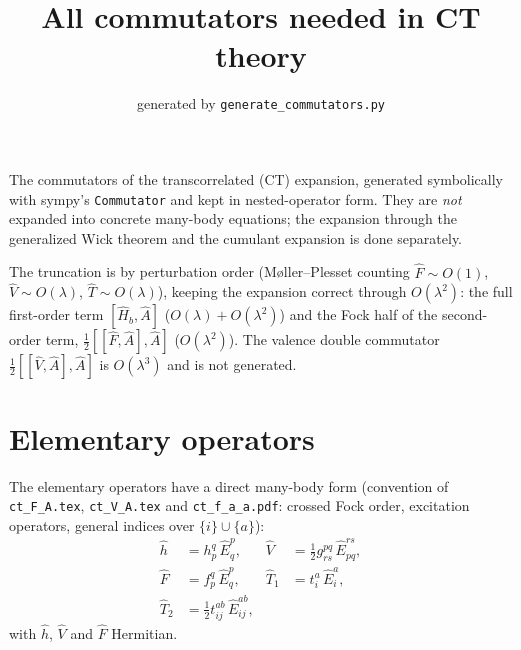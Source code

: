 \documentclass[11pt]{article}
\title{All commutators needed in CT theory}
\date{generated by \texttt{generate\_commutators.py}}
\begin{document}
\maketitle

The commutators of the transcorrelated (CT) expansion, generated symbolically with sympy's \texttt{Commutator} and kept in nested-operator form.  They are \emph{not} expanded into concrete many-body equations; the expansion through the generalized Wick theorem and the cumulant expansion is done separately.

The truncation is by perturbation order (M\o ller--Plesset counting $\hat{F} \sim O(1)$, $\hat{V} \sim O(\lambda)$, $\hat{T} \sim O(\lambda)$), keeping the expansion correct through $O(\lambda^2)$: the full first-order term $[\hat{H}_b, \hat{A}]$ ($O(\lambda) + O(\lambda^2)$) and the Fock half of the second-order term, $\tfrac{1}{2}[[\hat{F}, \hat{A}], \hat{A}]$ ($O(\lambda^2)$).  The valence double commutator $\tfrac{1}{2}[[\hat{V}, \hat{A}], \hat{A}]$ is $O(\lambda^3)$ and is not generated.

\section{Elementary operators}
The elementary operators have a direct many-body form (convention of \texttt{ct\_F\_A.tex}, \texttt{ct\_V\_A.tex} and \texttt{ct\_f\_a\_a.pdf}: crossed Fock order, excitation operators, general indices over $\{i\}\cup\{a\}$):
\begin{align}
\hat{h} &= h^q_p\, \hat{E}^p_q, & \hat{V} &= \tfrac{1}{2} g^{pq}_{rs}\, \hat{E}^{rs}_{pq}, \\
\hat{F} &= f^q_p\, \hat{E}^p_q, & \hat{T}_1 &= t^a_i\, \hat{E}^a_i, \\
\hat{T}_2 &= \tfrac{1}{2} t^{ab}_{ij}\, \hat{E}^{ab}_{ij},
\end{align}
with $\hat{h}$, $\hat{V}$ and $\hat{F}$ Hermitian.
\end{document}

